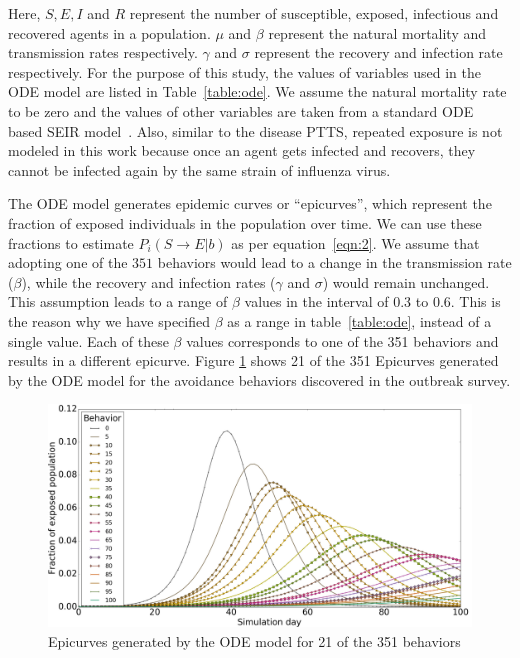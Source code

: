 \documentclass[doublespace]{VTthesis}
\begin{document}
    Here, $S,E,I$ and $R$ represent the number of susceptible, exposed, infectious and recovered agents in a population. $\mu$ and $\beta$ represent the natural mortality and transmission rates respectively. $\gamma$ and $\sigma$ represent the recovery and infection rate respectively. For the purpose of this study, the values of variables used in the ODE model are listed in Table~\ref{table:ode}. We assume the natural mortality rate to be zero and the values of other variables are taken from a standard ODE based SEIR model~\cite{keeling2008modeling}. Also, similar to the disease PTTS, repeated exposure is not modeled in this work because once an agent gets infected and recovers, they cannot be infected again by the same strain of influenza virus. 
    
    The ODE model generates epidemic curves or ``epicurves'', which represent the fraction of exposed individuals in the population over time. We can use these fractions to estimate $P_i(S \rightarrow E|b)$ as per equation~\ref{eqn:2}. We assume that adopting one of the $351$ behaviors would lead to a change in the transmission rate ($\beta$), while the recovery and infection rates ($\gamma$ and $\sigma$) would remain unchanged. This assumption leads to a range of $\beta$ values in the interval of 0.3 to 0.6. This is the reason why we have specified $\beta$ as a range in table~\ref{table:ode}, instead of a single value. Each of these $\beta$ values corresponds to one of the 351 behaviors and results in a different epicurve. Figure \ref{fig:epicurves} shows 21 of the 351 Epicurves generated by the ODE model for the avoidance behaviors discovered in the outbreak survey.
    \begin{figure}
    \centering
    \includegraphics[width=\textwidth]{figures/epicurves.png}
    \caption{Epicurves generated by the ODE model for 21 of the 351 behaviors}
    \label{fig:epicurves}
    \end{figure}
    
\end{document}
